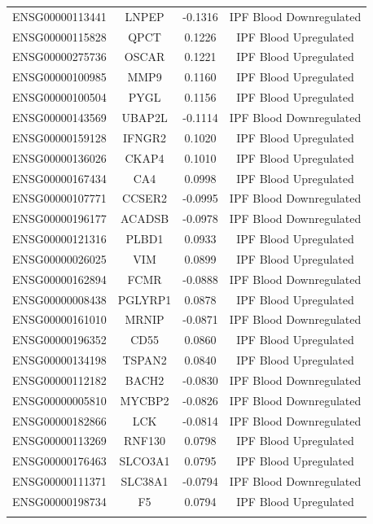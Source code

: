 \documentclass[
]{article}
\begin{document}
\begin{singlespace}
\begin{longtable}[t]{lccc}
\endfoot
\bottomrule
\endlastfoot
ENSG00000113441 & LNPEP & -0.1316 & IPF Blood Downregulated\\
ENSG00000115828 & QPCT & 0.1226 & IPF Blood Upregulated\\
ENSG00000275736 & OSCAR & 0.1221 & IPF Blood Upregulated\\
ENSG00000100985 & MMP9 & 0.1160 & IPF Blood Upregulated\\
ENSG00000100504 & PYGL & 0.1156 & IPF Blood Upregulated\\
\addlinespace
ENSG00000143569 & UBAP2L & -0.1114 & IPF Blood Downregulated\\
ENSG00000159128 & IFNGR2 & 0.1020 & IPF Blood Upregulated\\
ENSG00000136026 & CKAP4 & 0.1010 & IPF Blood Upregulated\\
ENSG00000167434 & CA4 & 0.0998 & IPF Blood Upregulated\\
ENSG00000107771 & CCSER2 & -0.0995 & IPF Blood Downregulated\\
\addlinespace
ENSG00000196177 & ACADSB & -0.0978 & IPF Blood Downregulated\\
ENSG00000121316 & PLBD1 & 0.0933 & IPF Blood Upregulated\\
ENSG00000026025 & VIM & 0.0899 & IPF Blood Upregulated\\
ENSG00000162894 & FCMR & -0.0888 & IPF Blood Downregulated\\
ENSG00000008438 & PGLYRP1 & 0.0878 & IPF Blood Upregulated\\
\addlinespace
ENSG00000161010 & MRNIP & -0.0871 & IPF Blood Downregulated\\
ENSG00000196352 & CD55 & 0.0860 & IPF Blood Upregulated\\
ENSG00000134198 & TSPAN2 & 0.0840 & IPF Blood Upregulated\\
ENSG00000112182 & BACH2 & -0.0830 & IPF Blood Downregulated\\
ENSG00000005810 & MYCBP2 & -0.0826 & IPF Blood Downregulated\\
\addlinespace
ENSG00000182866 & LCK & -0.0814 & IPF Blood Downregulated\\
ENSG00000113269 & RNF130 & 0.0798 & IPF Blood Upregulated\\
ENSG00000176463 & SLCO3A1 & 0.0795 & IPF Blood Upregulated\\
ENSG00000111371 & SLC38A1 & -0.0794 & IPF Blood Downregulated\\
ENSG00000198734 & F5 & 0.0794 & IPF Blood Upregulated\\
\addlinespace

\end{longtable}
\end{singlespace}
\end{document}
